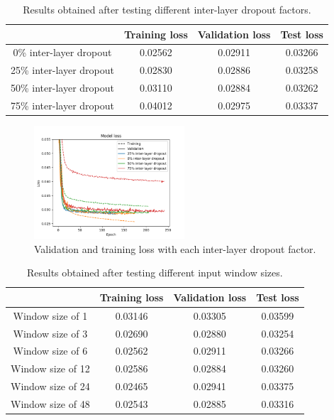 \documentclass[]{article}
\begin{document}
	\begin{table}[H]
		\centering
		\begin{tabular}{@{}cccc@{}}
			\toprule
			& Training loss & Validation loss & Test loss \\ \midrule
			0\% inter-layer dropout  & 0.02562       & 0.02911         & 0.03266   \\
			25\% inter-layer dropout & 0.02830       & 0.02886         & 0.03258   \\
			50\% inter-layer dropout & 0.03110       & 0.02884         & 0.03262   \\
			75\% inter-layer dropout & 0.04012       & 0.02975         & 0.03337   \\ \bottomrule
		\end{tabular}
		\caption{Results obtained after testing different inter-layer dropout factors.}
		\label{t:variables_3}
	\end{table}
	
	\begin{figure}[H]
		\centering
		\includegraphics[width=0.5\textwidth]{variables_3}
		\caption{Validation and training loss with each inter-layer dropout factor.}
		\label{f:variables_3}
	\end{figure}
	
	\begin{table}[H]
		\centering
		\begin{tabular}{@{}cccc@{}}
			\toprule
			& Training loss & Validation loss & Test loss \\ \midrule
			Window size of 1  & 0.03146       & 0.03305         & 0.03599   \\
			Window size of 3  & 0.02690       & 0.02880         & 0.03254   \\
			Window size of 6  & 0.02562       & 0.02911         & 0.03266   \\
			Window size of 12 & 0.02586       & 0.02884         & 0.03260   \\
			Window size of 24 & 0.02465       & 0.02941         & 0.03375   \\
			Window size of 48 & 0.02543       & 0.02885         & 0.03316   \\ \bottomrule
		\end{tabular}
		\caption{Results obtained after testing different input window sizes.}
		\label{t:variables_4}
	\end{table}
	
\end{document}
